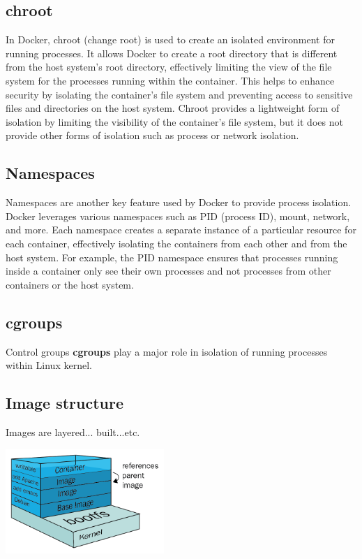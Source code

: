 \documentclass{article}
\begin{document}
\subsection*{chroot}
In Docker, chroot (change root) is used to create an isolated environment for running processes. It allows Docker to create a root directory that is different from the host system's root directory, effectively limiting the view of the file system for the processes running within the container. This helps to enhance security by isolating the container's file system and preventing access to sensitive files and directories on the host system. Chroot provides a lightweight form of isolation by limiting the visibility of the container's file system, but it does not provide other forms of isolation such as process or network isolation.
\subsection*{Namespaces}
Namespaces are another key feature used by Docker to provide process isolation. Docker leverages various namespaces such as PID (process ID), mount, network, and more. Each namespace creates a separate instance of a particular resource for each container, effectively isolating the containers from each other and from the host system. For example, the PID namespace ensures that processes running inside a container only see their own processes and not processes from other containers or the host system.
\subsection{cgroups}
Control groups \textbf{cgroups} play a major role in isolation of running processes within Linux kernel.  

\subsection{Image structure}
Images are layered... built...etc.
\begin{center}
  \includegraphics[width=0.450\textwidth]{000_Image_structure.png}
\end{center}
\end{document}
